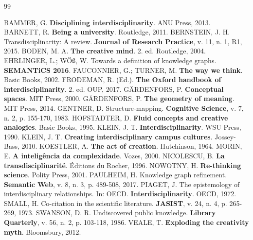 \documentclass[a4paper,12pt]{article}
\begin{document}


\begin{thebibliography}{99}

 BAMMER, G. \textbf{Disciplining interdisciplinarity}. ANU Press, 2013.
 BARNETT, R. \textbf{Being a university}. Routledge, 2011.
 BERNSTEIN, J. H. Transdisciplinarity: A review. \textbf{Journal of Research Practice}, v. 11, n. 1, R1, 2015.
 BODEN, M. A. \textbf{The creative mind}. 2. ed. Routledge, 2004.
 EHRLINGER, L.; WÖß, W. Towards a definition of knowledge graphs. \textbf{SEMANTiCS 2016}.
 FAUCONNIER, G.; TURNER, M. \textbf{The way we think}. Basic Books, 2002.
 FRODEMAN, R. (Ed.). \textbf{The Oxford handbook of interdisciplinarity}. 2. ed. OUP, 2017.
 GÄRDENFORS, P. \textbf{Conceptual spaces}. MIT Press, 2000.
 GÄRDENFORS, P. \textbf{The geometry of meaning}. MIT Press, 2014.
 GENTNER, D. Structure-mapping. \textbf{Cognitive Science}, v. 7, n. 2, p. 155-170, 1983.
 HOFSTADTER, D. \textbf{Fluid concepts and creative analogies}. Basic Books, 1995.
 KLEIN, J. T. \textbf{Interdisciplinarity}. WSU Press, 1990.
 KLEIN, J. T. \textbf{Creating interdisciplinary campus cultures}. Jossey-Bass, 2010.
 KOESTLER, A. \textbf{The act of creation}. Hutchinson, 1964.
 MORIN, E. \textbf{A inteligência da complexidade}. Vozes, 2000.
 NICOLESCU, B. \textbf{La transdisciplinarité}. Éditions du Rocher, 1996.
 NOWOTNY, H. \textbf{Re-thinking science}. Polity Press, 2001.
 PAULHEIM, H. Knowledge graph refinement. \textbf{Semantic Web}, v. 8, n. 3, p. 489-508, 2017.
 PIAGET, J. The epistemology of interdisciplinary relationships. In: OECD. \textbf{Interdisciplinarity}. OECD, 1972.
 SMALL, H. Co-citation in the scientific literature. \textbf{JASIST}, v. 24, n. 4, p. 265-269, 1973.
 SWANSON, D. R. Undiscovered public knowledge. \textbf{Library Quarterly}, v. 56, n. 2, p. 103-118, 1986.
 VEALE, T. \textbf{Exploding the creativity myth}. Bloomsbury, 2012.

\end{thebibliography}
\end{document}
